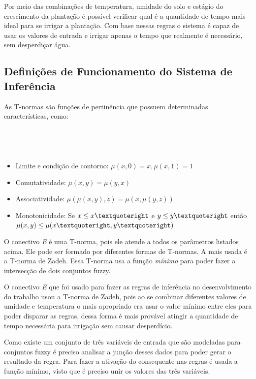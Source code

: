 \documentclass[
	article,			%
	11pt,				%
	oneside,			%
	a4paper,			%
	english,			%
	brazil,				%
	sumario=tradicional
	]{abntex2}
\begin{document}
\begin{multicols}{2}
  
Por meio das combinações de temperatura, umidade do solo e estágio do crescimento da plantação é possível verificar qual é a quantidade de tempo mais ideal para se irrigar a plantação. Com base nessas regras o sistema é capaz de usar os valores de entrada e irrigar apenas o tempo que realmente é necessário, sem desperdiçar água.


\subsection{Definições de Funcionamento do Sistema de Inferência}

As T-normas são funções de pertinência que possuem determinadas características, como:

~

~

\vfill
\columnbreak

\begin{itemize}
  \item Limite e condição de contorno: $\mu(x,0) = x, \mu(x,1) = 1$
  \item Comutatividade: $\mu(x,y) = \mu(y,x)$
  \item Associatividade: $\mu(\mu(x,y),z) = \mu(x, \mu(y,z)) $
  \item Monotonicidade: Se $x \leq x\textquoteright$ e $y \leq y\textquoteright$ então $\mu(x,y) \leq \mu( x\textquoteright ,y\textquoteright )$
\end{itemize}


O conectivo \textit{E} é uma T-norma, pois ele atende a todos os parâmetros listados acima. Ele pode ser formado por diferentes formas de T-normas. A mais usada é a T-norma de Zadeh. Essa T-norma usa a função \textit{mínimo} para poder fazer a intersecção de dois conjuntos fuzzy.

O conectivo \textit{E} que foi usado para fazer as regras de inferência no desenvolvimento do trabalho usou a T-norma de Zadeh, pois ao se combinar diferentes valores de umidade e temperatura o mais apropriado era usar o valor mínimo entre eles para poder disparar as regras, dessa forma é mais provável atingir a quantidade de tempo necessária para irrigação sem causar desperdício.

Como existe um conjunto de três variáveis de entrada que são modeladas para conjuntos fuzzy é preciso analisar a junção desses dados para poder gerar o resultado da regra. Para fazer a ativação do consequente nas regras é usada a função mínimo, visto que é preciso unir os valores das três variáveis.


\end{multicols}
\end{document}

